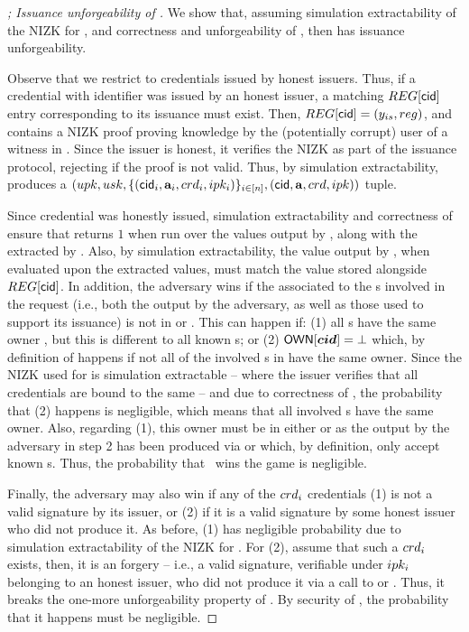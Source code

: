 \begin{proof}[; Issuance unforgeability of \CUASGen]
  We show that, assuming simulation extractability of the NIZK for \RelIss, and
  correctness and unforgeability of \SBCM, then \CUASGen has issuance
  unforgeability.

  Observe that we restrict to credentials issued by honest issuers. Thus, if a
  credential with identifier \cid was issued by an honest issuer, a matching
  $\trans[\cid]$ entry corresponding to its issuance must exist.
  Then, $\trans[\cid] = (\yissue,\utrans)$, and \utrans contains a NIZK proof
  \proofiss proving knowledge by the (potentially corrupt) user of a witness in
  \RelIss. Since the issuer is honest, it verifies the NIZK as part of the
  issuance protocol, rejecting if the proof is not valid. Thus, by simulation
  extractability, \ExtractIssue produces a $(upk,usk,\lbrace (\mathsf{cid}_i,\mathbf{a}_i,
  crd_i,ipk_i) \rbrace_{i\in[n]},(\mathsf{cid},\mathbf{a},crd,ipk))$ tuple.

  Since credential \cid was honestly issued, simulation extractability and
  correctness of \SBCM ensure that \VerCred returns $1$ when run over the values
  output by \adv, along with the \usk extracted by \ExtractIssue. Also, by
  simulation extractability, the value output by \fissue, when evaluated upon
  the extracted values, must match the \yissue value stored alongside
  $\trans[\cid]$.
  In addition, the adversary wins if the \uid associated to the {\cid}s involved
  in the request (i.e., both the \cid output by the adversary, as well as those
  used to support its issuance) is not in \HU or \CU. This can happen if: (1)
  all {\cid}s have the same owner \uid, but this \uid is different to all known
  {\uid}s; or (2) $\mathsf{OWN}[\boldsymbol{cid}] = \bot$ which, by definition of \OWNR happens if
  not all of the involved {\cid}s in \scid have the same owner. Since the NIZK
  used for \RelIss is simulation extractable -- where the issuer verifies that
  all credentials are bound to the same \usk -- and due to correctness of \SBCM,
  the probability that (2) happens is negligible, which means that all involved
  {\cid}s have the same owner. Also, regarding (1), this owner must be in either
  \HU or \CU as the \cid output by the adversary in step 2 has been produced via
  \ISSUE or \OBTISS which, by definition, only accept known {\uid}s. Thus, the
  probability that \adv~wins the \ExpForgeIssue game is negligible.

  Finally, the adversary may also win if any of the $crd_i$ credentials (1) is
  not a valid signature by its issuer, or (2) if it is a valid signature by some
  honest issuer who did not produce it. As before, (1) has negligible
  probability due to simulation extractability of the NIZK for \RelIss. For (2),
  assume that such a $crd_i$ exists, then, it is an \SBCM forgery -- i.e., a
  valid signature, verifiable under $ipk_i$ belonging to an honest issuer, who
  did not produce it via a call to \OBTISS or \ISSUE. Thus, it breaks the
  one-more unforgeability property of \SBCM. By security of \SBCM, the
  probability that it happens must be negligible.
\end{proof}

